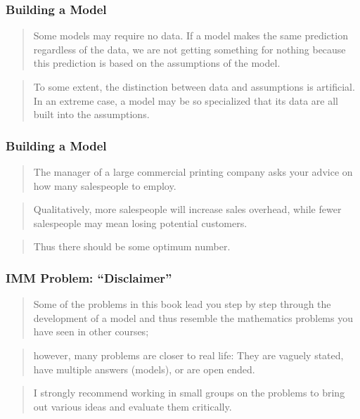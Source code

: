 \begin{frame}
    \frametitle{Building a Model}
    \begin{verse}
        Some models may require no data. If a model makes the same prediction
        regardless of the data, we are not getting something for nothing because
        this prediction is based on the assumptions of the model. 
    \end{verse}
   
    \begin{verse}
        To some extent,
        the distinction between data and assumptions is artificial. In an extreme
        case, a model may be so specialized that its data are all built into the
        assumptions.
    \end{verse}
\end{frame}

\begin{frame}
    \frametitle{Building a Model}
    \begin{verse}
        The manager of a large commercial printing company 
        asks your advice on how many salespeople to employ.  
    \end{verse}
    \begin{verse}
        Qualitatively, more salespeople will increase sales overhead,
        while fewer salespeople may mean losing potential customers. 
    \end{verse}
    \begin{verse}
       Thus there should be some optimum number.
    \end{verse}
    
\end{frame}


\begin{frame}
    \frametitle{IMM Problem: ``Disclaimer''}
    \begin{verse}
        Some of the problems in this book lead you step by step through the
        development of a model and thus resemble the mathematics problems you have
        seen in other courses; 
    \end{verse} 
    \begin{verse} 
        however, many problems are closer to real life:
        They are vaguely stated, have multiple answers (models), or are open
        ended. 
    \end{verse}
    \begin{verse}
        I strongly recommend working in small groups on the problems to
        bring out various ideas and evaluate them critically.
    \end{verse}
\end{frame}

